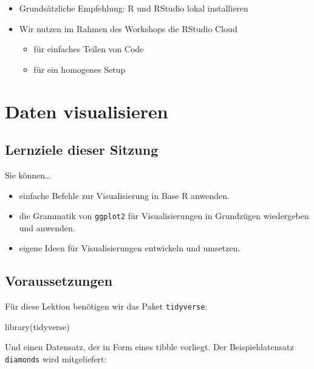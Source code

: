 \documentclass[11pt,german,a4paper]{article}
\newenvironment{Shaded}{\begin{snugshade}}{\end{snugshade}}
\newcommand{\FunctionTok}[1]{\textcolor[rgb]{0.00,0.00,0.00}{#1}}
\newcommand{\NormalTok}[1]{#1}
\providecommand{\tightlist}{%
  \setlength{\itemsep}{0pt}\setlength{\parskip}{0pt}}
\begin{document}
\begin{itemize}
\tightlist
\item
  Grundsätzliche Empfehlung: R und RStudio lokal installieren
\item
  Wir nutzen im Rahmen des Workshops die RStudio Cloud

  \begin{itemize}
  \tightlist
  \item
    für einfaches Teilen von Code
  \item
    für ein homogenes Setup
  \end{itemize}
\end{itemize}

\hypertarget{daten-visualisieren}{%
\section{Daten visualisieren}\label{daten-visualisieren}}

\hypertarget{lernziele-dieser-sitzung}{%
\subsection{Lernziele dieser Sitzung}\label{lernziele-dieser-sitzung}}

Sie können\ldots{}

\begin{itemize}
\tightlist
\item
  einfache Befehle zur Visualisierung in Base R anwenden.
\item
  die Grammatik von \texttt{ggplot2} für Visualisierungen in Grundzügen wiedergeben und anwenden.
\item
  eigene Ideen für Visualisierungen entwickeln und umsetzen.
\end{itemize}

\hypertarget{voraussetzungen}{%
\subsection{Voraussetzungen}\label{voraussetzungen}}

Für diese Lektion benötigen wir das Paket \texttt{tidyverse}:

\begin{Shaded}
\begin{Highlighting}[]
\FunctionTok{library}\NormalTok{(tidyverse)}
\end{Highlighting}
\end{Shaded}

Und einen Datensatz, der in Form eines tibble vorliegt. Der Beispieldatensatz \texttt{diamonds} wird mitgeliefert:
\end{document}
